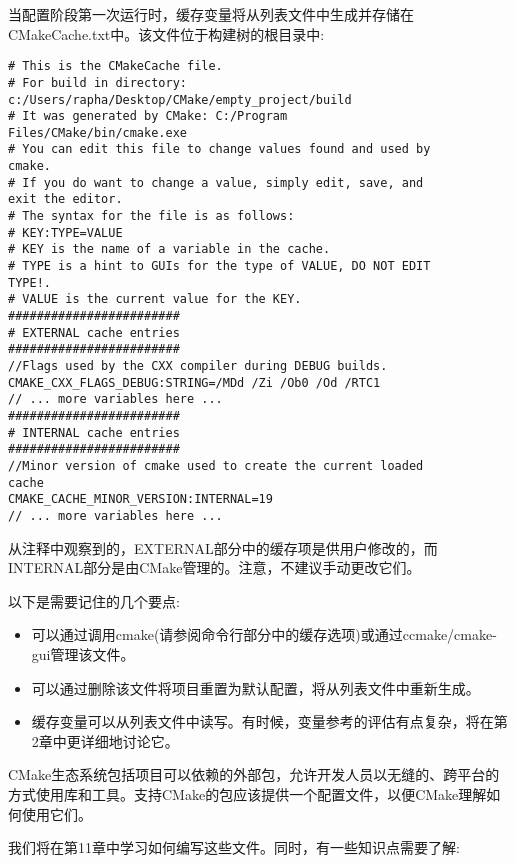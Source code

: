 
当配置阶段第一次运行时，缓存变量将从列表文件中生成并存储在CMakeCache.txt中。该文件位于构建树的根目录中:

\begin{lstlisting}[style=styleCMake]
# This is the CMakeCache file.
# For build in directory:
c:/Users/rapha/Desktop/CMake/empty_project/build
# It was generated by CMake: C:/Program
Files/CMake/bin/cmake.exe
# You can edit this file to change values found and used by
cmake.
# If you do want to change a value, simply edit, save, and
exit the editor.
# The syntax for the file is as follows:
# KEY:TYPE=VALUE
# KEY is the name of a variable in the cache.
# TYPE is a hint to GUIs for the type of VALUE, DO NOT EDIT
TYPE!.
# VALUE is the current value for the KEY.
########################
# EXTERNAL cache entries
########################
//Flags used by the CXX compiler during DEBUG builds.
CMAKE_CXX_FLAGS_DEBUG:STRING=/MDd /Zi /Ob0 /Od /RTC1
// ... more variables here ...
########################
# INTERNAL cache entries
########################
//Minor version of cmake used to create the current loaded
cache
CMAKE_CACHE_MINOR_VERSION:INTERNAL=19
// ... more variables here ...
\end{lstlisting}

从注释中观察到的，EXTERNAL部分中的缓存项是供用户修改的，而INTERNAL部分是由CMake管理的。注意，不建议手动更改它们。

以下是需要记住的几个要点:

\begin{itemize}
\item 
可以通过调用cmake(请参阅命令行部分中的缓存选项)或通过ccmake/cmake-gui管理该文件。

\item 
可以通过删除该文件将项目重置为默认配置，将从列表文件中重新生成。

\item 
缓存变量可以从列表文件中读写。有时候，变量参考的评估有点复杂，将在第2章中更详细地讨论它。
\end{itemize}


CMake生态系统包括项目可以依赖的外部包，允许开发人员以无缝的、跨平台的方式使用库和工具。支持CMake的包应该提供一个配置文件，以便CMake理解如何使用它们。

我们将在第11章中学习如何编写这些文件。同时，有一些知识点需要了解:


